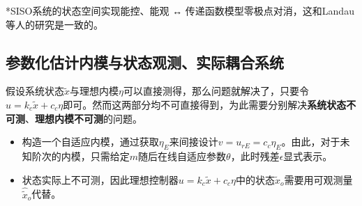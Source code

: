 \documentclass[
  12pt,
  a4paper
]{article}
\begin{document}
*SISO系统的状态空间实现能控、能观 ↔
传递函数模型零极点对消，这和Landau等人的研究是一致的。

\subsection{参数化估计内模与状态观测、实际耦合系统}\label{ux53c2ux6570ux5316ux4f30ux8ba1ux5185ux6a21ux4e0eux72b6ux6001ux89c2ux6d4bux5b9eux9645ux8026ux5408ux7cfbux7edf}

假设系统状态\(\widetilde{x}\)与理想内模\(\eta\)可以直接测得，那么问题就解决了，只要令\(u = k_{c}\widetilde{x} + c_{c}\eta\)即可。然而这两部分均不可直接得到，为此需要分别解决\textbf{系统状态不可测}、\textbf{理想内模不可测}的问题。

\begin{itemize}
\item
  构造一个自适应内模，通过获取\(\eta_{E}\)来间接设计\(v = u_{rE} = c_{c}\eta_{E}\)。由此，对于未知阶次的内模，只需给定\(m\)随后在线自适应参数\(\theta\)，此时残差\(\epsilon\)显式表示。
\item
  状态实际上不可测，因此理想控制器\(u = k_{c}\widetilde{x} + c_{c}\eta\)中的状态\({\widetilde{x}}_{o}\)需要用可观测量\({\widehat{\widetilde{x}}}_{o}\)代替。
\end{itemize}
\end{document}
